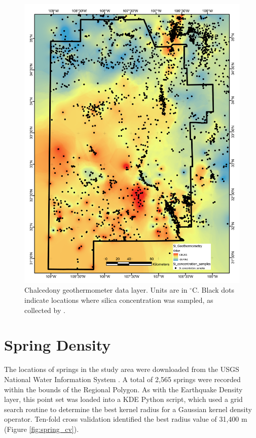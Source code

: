 \begin{figure}[H]
\centering
\includegraphics[width=0.75\linewidth]{templates/images/Figure-SiTemp.pdf}
\caption[Silica geothermometer temperature data layer]{Chalcedony geothermometer data layer. Units are in $^\circ$C. Black dots indicate locations where silica concentration was sampled, as collected by \protect\citet{bielicki_hydrogeolgic_2015}.}
\label{fig:feat_si_temp}
\end{figure}
\pagebreak

\section{Spring Density}\label{app:dl_spring_density}
The locations of springs in the study area were downloaded from the USGS National Water Information System \citep{usgs_national_2021}. A total of 2,565 springs were recorded within the bounds of the Regional Polygon. As with the Earthquake Density layer, this point set was loaded into a KDE Python script, which used a grid search routine to determine the best kernel radius for a Gaussian kernel density operator. Ten-fold cross validation identified the best radius value of 31,400 m (Figure \ref{fig:spring_cv}). 

